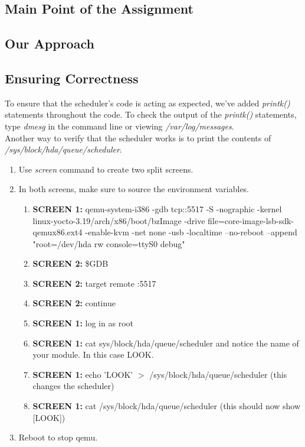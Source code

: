 \documentclass[draftclsnofoot, onecolumn, 10pt, compsoc]{IEEEtran}
\begin{document}
		\subsection{Main Point of the Assignment}

		\subsection{Our Approach}

		\subsection{Ensuring Correctness}
			To ensure that the scheduler's code is acting as expected, we've added \textit{printk()} statements throughout the code. To check the output of the \textit{printk()} statements, type \textit{dmesg} in the command line or viewing \textit{/var/log/messages}. \\
			Another way to verify that the scheduler works is to print the contents of \textit{/sys/block/hda/queue/scheduler}.
			\begin{enumerate}
				\item Use \textit{screen} command to create two split screens.
				\item In both screens, make sure to source the environment variables.
				\begin{enumerate}
					\item \textbf{SCREEN 1:} qemu-system-i386 -gdb tcp::5517 -S -nographic -kernel linux-yocto-3.19/arch/x86/boot/bzImage -drive file=core-image-lsb-sdk-qemux86.ext4 -enable-kvm -net none -usb -localtime --no-reboot --append "root=/dev/hda rw console=ttyS0 debug"
					\item \textbf{SCREEN 2:} \$GDB
					\item \textbf{SCREEN 2:} target remote :5517
					\item \textbf{SCREEN 2:} continue
					\item \textbf{SCREEN 1:} log in as root
					\item \textbf{SCREEN 1:} cat sys/block/hda/queue/scheduler and notice the name of your module. In this case LOOK.
					\item \textbf{SCREEN 1:} echo 'LOOK' $>$ /sys/block/hda/queue/scheduler (this changes the scheduler)
					\item \textbf{SCREEN 1:} cat /sys/block/hda/queue/scheduler (this should now show [LOOK])
				\end{enumerate}
				\item Reboot to stop qemu.
			\end{enumerate}
\end{document}
